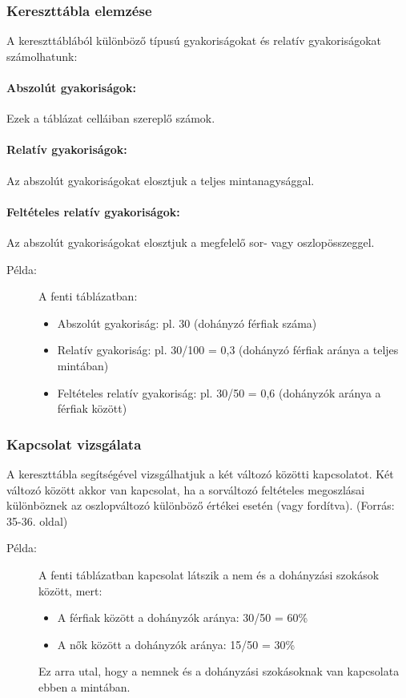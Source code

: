 \documentclass[a4paper,12pt]{article}
\begin{document}
\subsubsection{Kereszttábla elemzése}

A kereszttáblából különböző típusú gyakoriságokat és relatív gyakoriságokat számolhatunk:

\paragraph{Abszolút gyakoriságok:} Ezek a táblázat celláiban szereplő számok.

\paragraph{Relatív gyakoriságok:} Az abszolút gyakoriságokat elosztjuk a teljes mintanagysággal.

\paragraph{Feltételes relatív gyakoriságok:} Az abszolút gyakoriságokat elosztjuk a megfelelő sor- vagy oszlopösszeggel.

\begin{description}
\item[Példa:] A fenti táblázatban:
\begin{itemize}
    \item Abszolút gyakoriság: pl. 30 (dohányzó férfiak száma)
    \item Relatív gyakoriság: pl. 30/100 = 0,3 (dohányzó férfiak aránya a teljes mintában)
    \item Feltételes relatív gyakoriság: pl. 30/50 = 0,6 (dohányzók aránya a férfiak között)
\end{itemize}
\end{description}

\subsubsection{Kapcsolat vizsgálata}

A kereszttábla segítségével vizsgálhatjuk a két változó közötti kapcsolatot. Két változó között akkor van kapcsolat, ha a sorváltozó feltételes megoszlásai különböznek az oszlopváltozó különböző értékei esetén (vagy fordítva).
(Forrás: 35-36. oldal)

\begin{description}
\item[Példa:] A fenti táblázatban kapcsolat látszik a nem és a dohányzási szokások között, mert:
\begin{itemize}
    \item A férfiak között a dohányzók aránya: 30/50 = 60\%
    \item A nők között a dohányzók aránya: 15/50 = 30\%
\end{itemize}
Ez arra utal, hogy a nemnek és a dohányzási szokásoknak van kapcsolata ebben a mintában.
\end{description}
\end{document}
